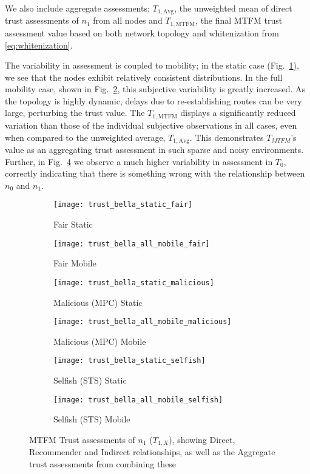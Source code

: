 We also include aggregate assessments; $T_{1,\text{Avg}}$, the unweighted mean of direct trust assessments of $n_1$ from all nodes and $T_{1,\text{MTFM}}$, the final MTFM trust assessment value based on both network topology and whitenization from \eqref{eq:whitenization}.

The variability in assessment is coupled to mobility; in the static case (Fig.~\ref{fig:trust_static}), we see that the nodes exhibit relatively consistent distributions.
In the full mobility case, shown in Fig.~\ref{fig:trust_all_mobile}, this subjective variability is greatly increased. 
As the topology is highly dynamic, delays due to re-establishing routes can be very large, perturbing the trust value.
The $T_{1,\text{MTFM}}$ displays a significantly reduced variation than those of the individual subjective observations in all cases, even when compared to the unweighted average, $T_{1,\text{Avg}}$.
This demonstrates $T_{MTFM}$'s value as an aggregating trust assessment in such sparse and noisy environments.
Further, in Fig.~\ref{fig:trust_all_mobile_mal} we observe a much higher variability in assessment in $T_0$, correctly indicating that there is something wrong with the relationship between $n_0$ and $n_1$.

\begin{figure}[h]
	\centering
	\begin{subfigure}{0.5\textwidth}
	\caption{Fair Static}
	\texttt{[image: trust\_bella\_static\_fair]} 
	\label{fig:trust_static}
	\end{subfigure}%
	\begin{subfigure}{0.5\textwidth}
	\caption{Fair Mobile}
	\texttt{[image: trust\_bella\_all\_mobile\_fair]}  
	\label{fig:trust_all_mobile}
	\end{subfigure}%
	
	\begin{subfigure}{0.5\textwidth}
	\caption{Malicious (MPC) Static}
	\texttt{[image: trust\_bella\_static\_malicious]} 
	\label{fig:trust_static_mal}
	\end{subfigure}%
	\begin{subfigure}{0.5\textwidth}
	\caption{Malicious (MPC) Mobile}
	\texttt{[image: trust\_bella\_all\_mobile\_malicious]}  
	\label{fig:trust_all_mobile_mal}
	\end{subfigure}%
	
	\begin{subfigure}{0.5\textwidth}
	\caption{Selfish (STS) Static}
	\texttt{[image: trust\_bella\_static\_selfish]}
	\label{fig:trust_static_sel}
	\end{subfigure}%
	\begin{subfigure}{0.5\textwidth}
	\caption{Selfish (STS) Mobile}
	\texttt{[image: trust\_bella\_all\_mobile\_selfish]}  \label{fig:trust_all_mobile_sel}
	\end{subfigure}%

	\caption{MTFM Trust assessments of $n_1$ ($T_{1,X}$), showing Direct, Recommender and Indirect relationships, as well as the Aggregate trust assessments from combining these} 
	\label{fig:trust_mobility}
\end{figure}
%

